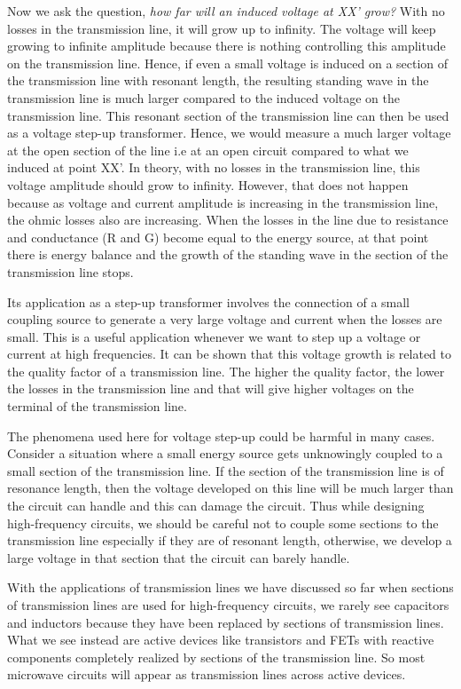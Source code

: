 Now we ask the question, \emph{how far will an induced voltage at XX' grow?} With no losses in the transmission line, it will grow up to infinity. The voltage will keep growing to infinite amplitude because there is nothing controlling this amplitude on the transmission line. Hence, if even a small voltage is induced on a section of the transmission line with resonant length, the resulting standing wave in the transmission line is much larger compared to the induced voltage on the transmission line. This resonant section of the transmission line can then be used as a voltage step-up transformer. Hence, we would measure a much larger voltage at the open section of the line i.e at an open circuit compared to what we induced at point XX'. In theory, with no losses in the transmission line, this voltage amplitude should grow to infinity. However, that does not happen because as voltage and current amplitude is increasing in the transmission line, the ohmic losses also are increasing. When the losses in the line due to resistance and conductance (R and G) become equal to the energy source, at that point there is energy balance and the growth of the standing wave in the section of the transmission line stops.

Its application as a step-up transformer involves the connection of a small coupling source to generate a very large voltage and current when the losses are small. This is a useful application whenever we want to step up a voltage or current at high frequencies. It can be shown that this voltage growth is related to the quality factor of a transmission line. The higher the quality factor, the lower the losses in the transmission line and that will give higher voltages on the terminal of the transmission line.

The phenomena used here for voltage step-up could be harmful in many cases. Consider a situation where a small energy source gets unknowingly coupled to a small section of the transmission line. If the section of the transmission line is of resonance length, then the voltage developed on this line will be much larger than the circuit can handle and this can damage the circuit. Thus while designing high-frequency circuits, we should be careful not to couple some sections to the transmission line especially if they are of resonant length, otherwise, we develop a large voltage in that section that the circuit can barely handle. 

With the applications of transmission lines we have discussed so far when sections of transmission lines are used for high-frequency circuits, we rarely see capacitors and inductors because they have been replaced by sections of transmission lines. What we see instead are active devices like transistors and FETs with reactive components completely realized by sections of the transmission line. So most microwave circuits will appear as transmission lines across active devices.

